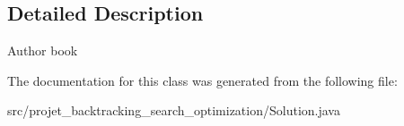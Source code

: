 \subsection{Detailed Description}
\begin{DoxyAuthor}{Author}
book 
\end{DoxyAuthor}


The documentation for this class was generated from the following file\+:\begin{DoxyCompactItemize}
\item 
src/projet\+\_\+backtracking\+\_\+search\+\_\+optimization/Solution.\+java\end{DoxyCompactItemize}
